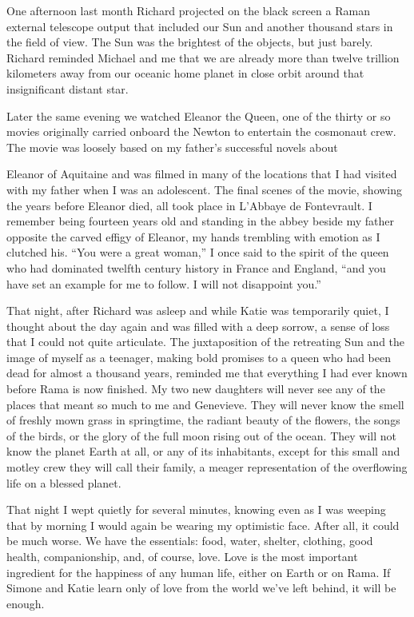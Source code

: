 \documentclass[]{article}
\begin{document}
One afternoon last month Richard projected on the black screen a Raman external telescope output that included our Sun and another thousand stars in the field of view.  The Sun was the brightest of the objects, but just barely.  Richard reminded Michael and me that we are already more than twelve trillion kilometers away from our oceanic home planet in close orbit around that insignificant distant star.

Later the same evening we watched Eleanor the Queen, one of the thirty or so movies originally carried onboard the Newton to entertain the cosmonaut crew.  The movie was loosely based on my father’s successful novels about

Eleanor of Aquitaine and was filmed in many of the locations that I had visited with my father when I was an adolescent.  The final scenes of the movie, showing the years before Eleanor died, all took place in L’Abbaye de Fontevrault.  I remember being fourteen years old and standing in the abbey beside my father opposite the carved effigy of Eleanor, my hands trembling with emotion as I clutched his.  “You were a great woman,” I once said to the spirit of the queen who had dominated twelfth century history in France and England, “and you have set an example for me to follow.  I will not disappoint you.”

That night, after Richard was asleep and while Katie was temporarily quiet, I thought about the day again and was filled with a deep sorrow, a sense of loss that I could not quite articulate.  The juxtaposition of the retreating Sun and the image of myself as a teenager, making bold promises to a queen who had been dead for almost a thousand years, reminded me that everything I had ever known before Rama is now finished.  My two new daughters will never see any of the places that meant so much to me and Genevieve.  They will never know the smell of freshly mown grass in springtime, the radiant beauty of the flowers, the songs of the birds, or the glory of the full moon rising out of the ocean.  They will not know the planet Earth at all, or any of its inhabitants, except for this small and motley crew they will call their family, a meager representation of the overflowing life on a blessed planet.

That night I wept quietly for several minutes, knowing even as I was weeping that by morning I would again be wearing my optimistic face.  After all, it could be much worse.  We have the essentials: food, water, shelter, clothing, good health, companionship, and, of course, love.  Love is the most important ingredient for the happiness of any human life, either on Earth or on Rama.  If Simone and Katie learn only of love from the world we’ve left behind, it will be enough.
\end{document}

